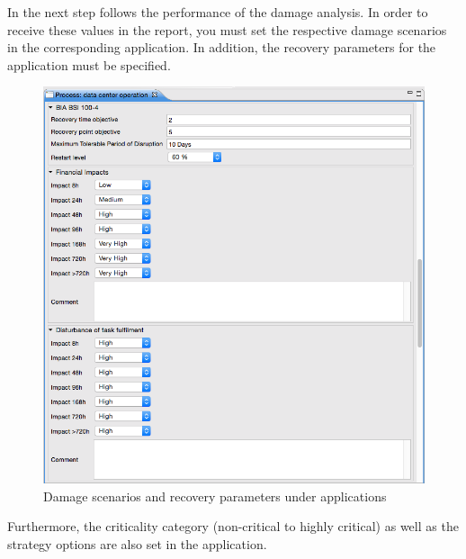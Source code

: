 \documentclass[a4paper,10pt]{book}
\begin{document}
In the next step follows the performance of the damage analysis. In order to
receive these values in the report, you must set the respective damage scenarios
in the corresponding application. In addition, the recovery parameters for the
application must be specified.

\begin{figure}[!htb]
  \centering
  \includegraphics[width=\linewidth]{Screenshot/damage-scenarios-and-recovery-parameters-under-applications.png}
  \caption{Damage scenarios and recovery parameters under applications}
  \label{fig:damage-scenarios-and-recovery-parameters-under-applications}
\end{figure}

Furthermore, the criticality category (non-critical to highly critical) as well
as the strategy options are also set in the application.
\end{document}

